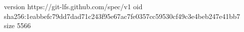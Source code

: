 version https://git-lfs.github.com/spec/v1
oid sha256:1eabbefc79dd7dad71c243f95e67ac7fe0357cc59530cf49c3e4beb247e41bb7
size 5566
